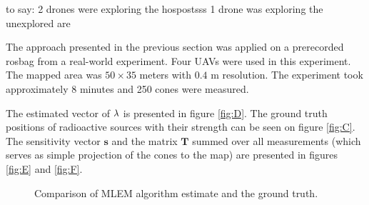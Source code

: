 to say:
2 drones were exploring the hospostsss
1 drone was exploring the unexplored are






The approach presented in the previous section was applied on a prerecorded rosbag from a real-world experiment.
Four \ac{UAV}s were used in this experiment.
The mapped area was $50 \times 35$ meters with $0.4$ m resolution.
The experiment took approximately 8 minutes and 250 cones were measured.

The estimated vector of $\bf{\lambda}$ is presented in figure \ref{fig:D}. 
The ground truth positions of radioactive sources with their strength can be seen on figure \ref{fig:C}.
The sensitivity vector $\mathbf{s}$ and the matrix $\mathbf{T}$ summed over all measurements (which serves as simple projection of the cones to the map) are presented in figures \ref{fig:E} and \ref{fig:F}.
\begin{figure}[!h]
  \centering
  \label{fig:A}
  \caption{Comparison of MLEM algorithm estimate and the ground truth.}
\end{figure}

